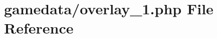 \hypertarget{overlay__1_8php}{\section{gamedata/overlay\+\_\+1.php File Reference}
\label{overlay__1_8php}
}
